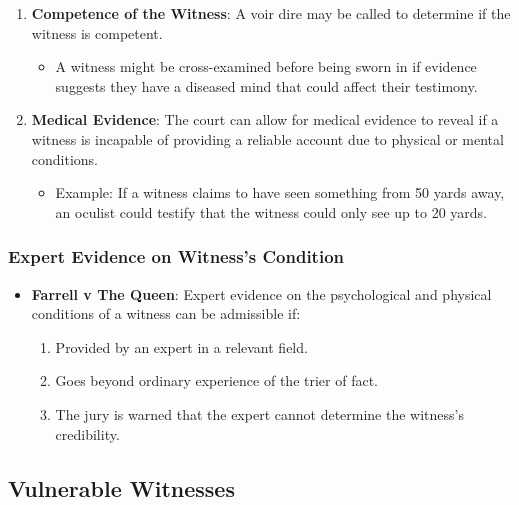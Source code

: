 \begin{enumerate}
\def\labelenumi{\arabic{enumi}.}
\tightlist
\item
  \textbf{Competence of the Witness}: A voir dire may be called to
  determine if the witness is competent.

  \begin{itemize}
  \tightlist
  \item
    A witness might be cross-examined before being sworn in if evidence
    suggests they have a diseased mind that could affect their
    testimony.
  \end{itemize}
\item
  \textbf{Medical Evidence}: The court can allow for medical evidence to
  reveal if a witness is incapable of providing a reliable account due
  to physical or mental conditions.

  \begin{itemize}
  \tightlist
  \item
    Example: If a witness claims to have seen something from 50 yards
    away, an oculist could testify that the witness could only see up to
    20 yards.
  \end{itemize}
\end{enumerate}

\subsubsection{Expert Evidence on Witness's
Condition}\label{expert-evidence-on-witnesss-condition}

\begin{itemize}
\tightlist
\item
  \textbf{Farrell v The Queen}: Expert evidence on the psychological and
  physical conditions of a witness can be admissible if:

  \begin{enumerate}
  \def\labelenumi{\arabic{enumi}.}
  \tightlist
  \item
    Provided by an expert in a relevant field.
  \item
    Goes beyond ordinary experience of the trier of fact.
  \item
    The jury is warned that the expert cannot determine the witness's
    credibility.
  \end{enumerate}
\end{itemize}

\subsection{  Vulnerable Witnesses}\label{vulnerable-witnesses-1}

